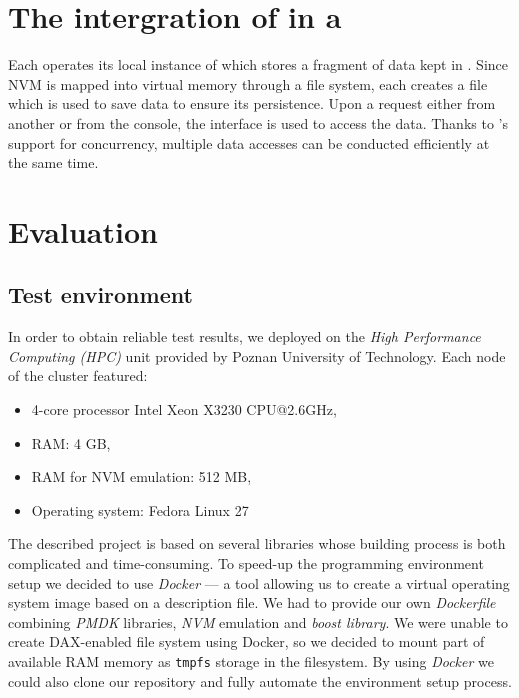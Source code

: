 \section{The intergration of \PHT in a \Node}

    Each \Node operates its local instance of \PHT which stores a fragment of data kept in \DHTS. Since NVM is mapped into virtual memory through a file system, each \Node creates a file which is used to save data to ensure its persistence. Upon a request either from another \Node or from the console, the \PHT interface is used to access the data. Thanks to \PHT's support for concurrency, multiple data accesses can be conducted efficiently at the same time.

\section{Evaluation}

    \subsection{Test environment}
        In order to obtain reliable test results, we deployed \DHTS on the \textit{High Performance Computing (HPC)} unit provided by Poznan University of Technology. Each node of the cluster featured:
        
        \begin{itemize}
            \item 4-core processor Intel Xeon X3230 CPU@2.6GHz,
            \item RAM: 4 GB,
            \item RAM for NVM emulation: 512 MB,
            \item Operating system: Fedora Linux 27
        \end{itemize}
        
        The described project is based on several libraries whose building process is both complicated and time-consuming.
        To speed-up the programming environment setup we decided to use \textit{Docker} \cite{Docker} --- a tool allowing us to create a virtual operating system image based on a description file.
        We had to provide our own \textit{Dockerfile} combining \textit{PMDK} libraries, \textit{NVM} emulation and \textit{boost library}.
        We were unable to create DAX-enabled file system using Docker, so we decided to mount part of available RAM memory as \texttt{tmpfs} storage in the filesystem.
        By using \textit{Docker} we could also clone our repository and fully automate the environment setup process.
        
